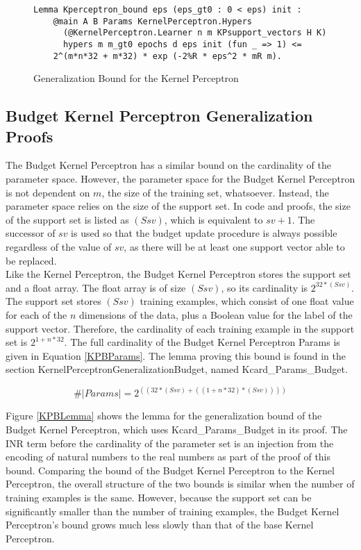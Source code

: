 \begin{figure}
    \caption{Generalization Bound for the Kernel Perceptron}
    \label{KPLemma}
    \begin{lstlisting}
Lemma Kperceptron_bound eps (eps_gt0 : 0 < eps) init : 
    @main A B Params KernelPerceptron.Hypers 
      (@KernelPerceptron.Learner n m KPsupport_vectors H K)
      hypers m m_gt0 epochs d eps init (fun _ => 1) <=
    2^(m*n*32 + m*32) * exp (-2%R * eps^2 * mR m).
    \end{lstlisting}
\end{figure}

\subsection{Budget Kernel Perceptron Generalization Proofs}\label{KPBProofs}
The Budget Kernel Perceptron has a similar bound on the cardinality of the parameter space. However, the parameter space for the Budget Kernel Perceptron is not dependent on $m$, the size of the training set, whatsoever. Instead, the parameter space relies on the size of the support set. In code and proofs, the size of the support set is listed as $(S sv)$, which is equivalent to $sv + 1$. The successor of $sv$ is used so that the budget update procedure is always possible regardless of the value of $sv$, as there will be at least one support vector able to be replaced.
\\Like the Kernel Perceptron, the Budget Kernel Perceptron stores the support set and a float array. The float array is of size $(S sv)$, so its cardinality is $2^{32 * (S sv)}$. The support set stores $(S sv)$ training examples, which consist of one float value for each of the $n$ dimensions of the data, plus a Boolean value for the label of the support vector. Therefore, the cardinality of each training example in the support set is $2^{1 + n * 32}$. The full cardinality of the Budget Kernel Perceptron Params is given in Equation \ref{KPBParams}. The lemma proving this bound is found in the section KernelPerceptronGeneralizationBudget, named Kcard\_Params\_Budget.

\begin{equation} \label{KPBParams}
 \#|Params| = 2^{((32*(S sv) + ((1 + n * 32)*(S sv))))}
\end{equation}

Figure \ref{KPBLemma} shows the lemma for the generalization bound of the Budget Kernel Perceptron, which uses Kcard\_Params\_Budget in its proof. The INR term before the cardinality of the parameter set is an injection from the encoding of natural numbers to the real numbers as part of the proof of this bound. Comparing the bound of the Budget Kernel Perceptron to the Kernel Perceptron, the overall structure of the two bounds is similar when the number of training examples is the same. However, because the support set can be significantly smaller than the number of training examples, the Budget Kernel Perceptron's bound grows much less slowly than that of the base Kernel Perceptron. 

